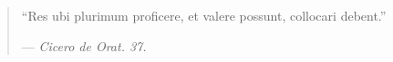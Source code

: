 \documentclass[a4paper, 12pt, oneside, twocolumn]{article}
\begin{document}
\pagestyle{fancy}
\fancyhf{} %
\renewcommand{\headrulewidth}{0pt} %
\cfoot{\Fontauri{\thepage}}
\vspace*{\fill}
\begin{quote} 
``Res ubi plurimum proficere, et valere possunt, collocari debent.''

--- \emph{Cicero de Orat. 37.}
\end{quote}
\vspace*{\fill}
\clearpage
\pagestyle{fancy}
\fancyhf{} %
\renewcommand{\headrulewidth}{0pt} %
\rfoot{\Fontauri{\thepage}}
\twocolumn
{}
\setlength{\parskip}{1mm plus1mm minus1mm}
\setcounter{tocdepth}{3}
\setcounter{secnumdepth}{3}
\end{document}
